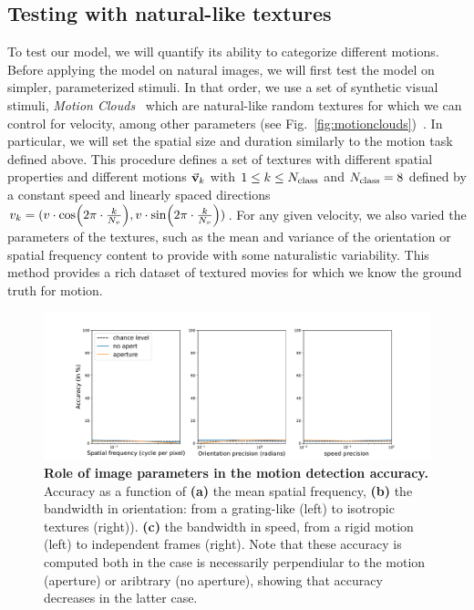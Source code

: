 \documentclass[default]{sn-jnl}%
\theoremstyle{thmstyleone}%
\theoremstyle{thmstyletwo}%
\theoremstyle{thmstylethree}%
\newcommand{\seeFig}[1]{see Fig.~\ref{fig:#1}}%
\begin{document}
\subsection{Testing with natural-like textures}
To test our model, we will quantify its ability to categorize different motions. Before applying the model on natural images, we will first test the model on simpler, parameterized stimuli. In that order, we use a set of synthetic visual stimuli, \textit{Motion Clouds}~\citep{leon_motion_2012} which are natural-like random textures for which we can control for velocity, among other parameters (\seeFig{motionclouds})~\citep{vacher_bayesian_2018}. In particular, we will set the spatial size and duration similarly to the motion task defined above.
This procedure defines a set of textures with different spatial properties and different motions $\va{v}_k$ with  $1 \le k \le N_\text{class}$ and $N_\text{class}=8$ defined by a constant speed and linearly spaced directions $
v_k = 
  ( 
    v \cdot \cos(2\pi\cdot \frac{k}{N_v}),
    v \cdot \sin(2\pi\cdot \frac{k}{N_v})
  )
$.
For any given velocity, we also varied the parameters of the textures, such as the mean and variance of the orientation or spatial frequency content to provide with some naturalistic variability. This method provides a rich dataset of textured movies for which we know the ground truth for motion.

\begin{figure}[h!]
    \centering
    \includegraphics[width=0.95\linewidth]{figures/motion_clouds.pdf}
    \caption{{\bf Role of image parameters in the motion detection accuracy.} Accuracy as a function of {\bf (a)} the mean spatial frequency, {\bf (b)} the bandwidth in orientation: from a grating-like (left) to isotropic textures (right)). {\bf (c)} the bandwidth in speed, from a rigid motion (left) to independent frames (right). Note that these accuracy is computed both in the case is necessarily perpendiular to the motion (aperture) or aribtrary (no aperture), showing that accuracy decreases in the latter case.}
    \label{fig:motion_clouds}
\end{figure}
\end{document}
